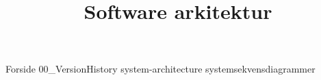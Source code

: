 \documentclass[a4paper,openany]{memoir}
\title{Software arkitektur}
\begin{document}
	{Forside}  \newpage
	\tableofcontents\thispagestyle{fancy}
	{00_VersionHistory}  \newpage
	{system-architecture}  \newpage
	{systemsekvensdiagrammer}  \newpage
	
	
	 {}
	\printbibliography
\end{document}
